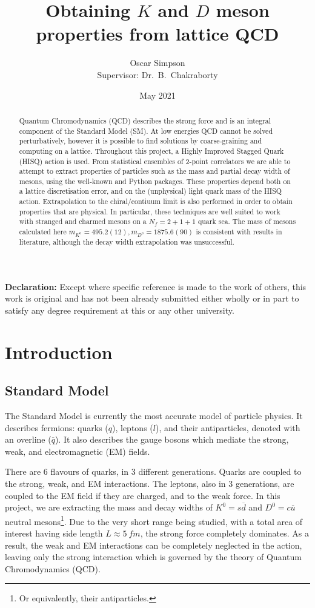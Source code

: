 \documentclass[a4paper,12pt]{article}
\title{Obtaining $K$ and $D$ meson properties from lattice QCD}
\author{Oscar Simpson \\ Supervisor: Dr.\ B.\ Chakraborty}
\date{May 2021}
\begin{document}
\maketitle
\begin{abstract}
    Quantum Chromodynamics (QCD) describes the strong force and is an integral component of the Standard Model (SM). At low energies QCD cannot be solved perturbatively, however it is possible to find solutions by coarse-graining and computing on a lattice. Throughout this project, a Highly Improved Stagged Quark (HISQ) action is used. From statistical ensembles of 2-point correlators we are able to attempt to extract properties of particles such as the mass and partial decay width of mesons, using the well-known  and  Python packages. These properties depend both on a lattice discretisation error, and on the (unphysical) light quark mass of the HISQ action. Extrapolation to the chiral/contiuum limit is also performed in order to obtain properties that are physical. In particular, these techniques are well suited to work with stranged and charmed mesons on a $N_f = 2 + 1 + 1$ quark sea. The mass of mesons calculated here $m_{K^0}=495.2(12), m_{D^0}=1875.6(90)$ is consistent with results in literature, although the decay width extrapolation was unsuccessful.
\end{abstract} 

\textbf{Declaration:} Except where specific reference is made to the work of others, this work is original and has not been already submitted either wholly or in part to satisfy any degree requirement at this or any other university.

\pagebreak
\tableofcontents
\pagebreak

\section{Introduction}
\subsection{Standard Model}
The Standard Model is currently the most accurate model of particle physics. It describes fermions: quarks ($q$), leptons ($l$), and their antiparticles, denoted with an overline ($\overline{q}$). It also describes the gauge bosons which mediate the strong, weak, and electromagnetic (EM) fields. 

There are 6 flavours of quarks, in 3 different generations. Quarks are coupled to the strong, weak, and EM interactions. The leptons, also in 3 generations, are coupled to the EM field if they are charged, and to the weak force. In this project, we are extracting the mass and decay widths of $K^0=s \overline{d}$ and $D^0= c \overline{u}$ neutral mesons\footnote{Or equivalently, their antiparticles.}. Due to the very short range being studied, with a total area of interest having side length $L \approx \SI{5}{fm}$, the strong force completely dominates. As a result, the weak and EM interactions can be completely neglected in the action, leaving only the strong interaction which is governed by the theory of Quantum Chromodynamics (QCD).
\end{document}
